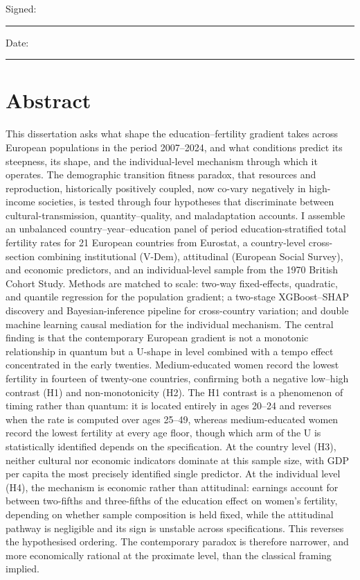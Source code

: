 \documentclass[12pt,a4paper]{report}
\begin{document}
\vspace{1.5cm}
\noindent Signed: \rule{6cm}{0.4pt}

\vspace{0.8cm}
\noindent Date: \rule{6cm}{0.4pt}

\chapter*{Abstract}
This dissertation asks what shape the education--fertility gradient takes across European
populations in the period 2007--2024, and what conditions predict its steepness, its shape,
and the individual-level mechanism through which it operates. The demographic transition
fitness paradox, that resources and reproduction, historically positively coupled, now
co-vary negatively in high-income societies, is tested through four hypotheses that
discriminate between cultural-transmission, quantity--quality, and maladaptation accounts.
I assemble an unbalanced country--year--education panel of period education-stratified
total fertility rates for 21 European countries from Eurostat, a country-level cross-section
combining institutional (V-Dem), attitudinal (European Social Survey), and economic
predictors, and an individual-level sample from the 1970 British Cohort Study. Methods are
matched to scale: two-way fixed-effects, quadratic, and quantile regression for the
population gradient; a two-stage XGBoost--SHAP discovery and Bayesian-inference pipeline for
cross-country variation; and double machine learning causal mediation for the individual
mechanism. The central finding is that the contemporary European gradient is not a monotonic
relationship in quantum but a U-shape in level combined with a tempo effect concentrated in the early
twenties. Medium-educated women record the lowest fertility in fourteen of twenty-one
countries, confirming both a negative low--high contrast (H1) and non-monotonicity (H2). The H1
contrast is a phenomenon of timing rather than quantum: it is located
entirely in ages 20--24 and reverses when the rate is computed over ages 25--49, whereas
medium-educated women record the lowest fertility at every age floor, though which arm of the
U is statistically identified depends on the specification. At
the country level (H3), neither cultural nor economic indicators dominate at this sample
size, with GDP per capita the most precisely identified single predictor. At the individual
level (H4), the mechanism is economic rather than attitudinal: earnings account for
between two-fifths and three-fifths of the education effect on women's fertility, depending on whether
sample composition is held fixed, while the attitudinal pathway is negligible and its sign is unstable
across specifications. This reverses the hypothesised ordering.
The contemporary paradox is therefore
narrower, and more economically rational at the proximate level, than the classical framing
implied.
\end{document}
